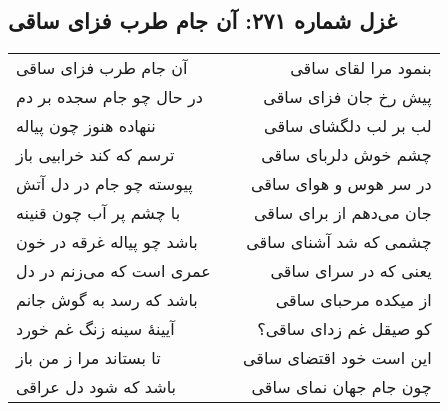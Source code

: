 \begin{center}
\section*{غزل شماره ۲۷۱: آن جام طرب فزای ساقی}
\label{sec:271}
\begin{longtable}{l p{0.5cm} r}
آن جام طرب فزای ساقی
&&
بنمود مرا لقای ساقی
\\
در حال چو جام سجده بر دم
&&
پیش رخ جان فزای ساقی
\\
ننهاده هنوز چون پیاله
&&
لب بر لب دلگشای ساقی
\\
ترسم که کند خرابیی باز
&&
چشم خوش دلربای ساقی
\\
پیوسته چو جام در دل آتش
&&
در سر هوس و هوای ساقی
\\
با چشم پر آب چون قنینه
&&
جان می‌دهم از برای ساقی
\\
باشد چو پیاله غرقه در خون
&&
چشمی که شد آشنای ساقی
\\
عمری است که می‌زنم در دل
&&
یعنی که در سرای ساقی
\\
باشد که رسد به گوش جانم
&&
از میکده مرحبای ساقی
\\
آیینهٔ سینه زنگ غم خورد
&&
کو صیقل غم زدای ساقی؟
\\
تا بستاند مرا ز من باز
&&
این است خود اقتضای ساقی
\\
باشد که شود دل عراقی
&&
چون جام جهان نمای ساقی
\\
\end{longtable}
\end{center}
